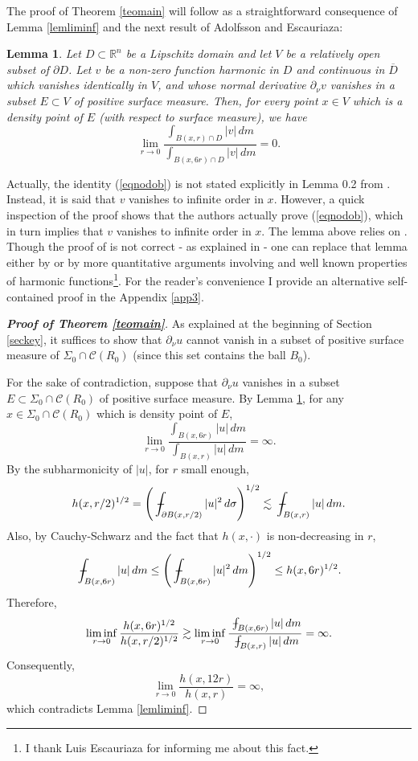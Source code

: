 \documentclass[11pt]{amsart}
\newcommand{\R}{{\mathbb R}}       %
\newcommand{\CC}{{\mathcal C}}
\newcommand{\rf}[1]{{(\ref{#1})}}
\newcommand{\vv}{{\vspace{2mm}}}
\def\Xint#1{\mathchoice
{\XXint\displaystyle\textstyle{#1}}%
{\XXint\textstyle\scriptstyle{#1}}%
{\XXint\scriptstyle\scriptscriptstyle{#1}}%
{\XXint\scriptscriptstyle\scriptscriptstyle{#1}}%
\!\int}
\def\XXint#1#2#3{{\setbox0=\hbox{$#1{#2#3}{\int}$ }
\vcenter{\hbox{$#2#3$ }}\kern-.58\wd0}}
\def\avint{\;\Xint-}
\newtheorem{lemma}[theorem]{Lemma}
\theoremstyle{definition}
\theoremstyle{remark}
\numberwithin{equation}{section}
\begin{document}
The proof of Theorem \ref{teomain} will follow as a straightforward consequence of Lemma \ref{lemliminf}
and the next result of Adolfsson and Escauriaza:

\begin{lemma}\cite[Lemma 0.2]{AE} \label{lemAE}
Let $D\subset\R^n$ be a Lipschitz domain and let $V$ be a relatively open subset of $\partial D$.
Let $v$ be a non-zero function harmonic in $D$ and continuous in $\overline D$ which vanishes identically
in $V$, and whose normal derivative $\partial_\nu v$ vanishes in a subset $E\subset V$ of positive
surface measure. Then, for every point $x\in V$ which is a density point of $E$ (with respect to surface measure),
we have
\begin{equation}\label{eqnodob}
\lim_{r\to 0} \frac{\int_{B(x,r)\cap D} |v|\,dm}{\int_{B(x,6r)\cap D} |v|\,dm} = 0.
\end{equation}
\end{lemma}

Actually, the identity \rf{eqnodob} is not stated explicitly in
Lemma 0.2 from \cite{AE}. Instead, it is said that $v$ vanishes to infinite order in $x$. However, a quick 
inspection of the proof shows that the authors actually prove \rf{eqnodob}, which in turn implies that
$v$ vanishes to infinite order in $x$. 
The lemma above relies on \cite[Lemma 1 and Theorem 1]{AEK}. Though the proof of \cite[Lemma 1]{AEK} is not correct - as explained in \cite[paragraph before Lemma 5]{AEWZ} -  one can replace that lemma either
by \cite[Lemma 2.2]{AE} or by more quantitative arguments involving \cite[Lemma 4]{AEWZ} and well known properties of harmonic functions\footnote{I thank Luis Escauriaza for informing me about this fact.}.  For the reader's convenience I provide an alternative self-contained proof in the Appendix \ref{app3}.


\vv

\begin{proof}[\bf Proof of Theorem \ref{teomain}]
As explained at the beginning of Section \ref{seckey}, it suffices to show that $\partial_\nu u$ cannot vanish
in a subset of positive surface measure of $\Sigma_0 \cap \CC(R_0)$ (since this set contains the ball $B_0$). 

For the sake of contradiction, suppose that $\partial_\nu u$ vanishes in a subset $E\subset
\Sigma_0 \cap \CC(R_0)$ of positive surface measure. By Lemma \ref{lemAE}, for any $x\in \Sigma_0 \cap \CC(R_0)$
which is density point of $E$, 
$$\lim_{r\to 0} \frac{\int_{B(x,6r)} |u|\,dm}{\int_{B(x,r)} |u|\,dm} = \infty.$$
By the subharmonicity of $|u|$, for $r$ small enough,
$$h(x,r/2)^{1/2} = \left(\avint_{\partial B(x,r/2)}|u|^2\,d\sigma\right)^{1/2}\lesssim \avint_{B(x,r)}|u|\,dm.$$
Also, by Cauchy-Schwarz and the fact that $h(x,\cdot)$ is non-decreasing in $r$,
$$\avint_{B(x,6r)} |u|\,dm \leq \left(\avint_{B(x,6r)} |u|^2\,dm\right)^{1/2}\leq
h(x,6r)^{1/2}.$$
Therefore,
$$\liminf_{r\to0} \frac{h(x,6r)^{1/2}}{h(x,r/2)^{1/2}} \gtrsim \liminf_{r\to0}  \frac{\avint_{B(x,6r)} |u|\,dm}{\avint_{B(x,r)} |u|\,dm} = \infty.$$
Consequently,
$$\lim_{r\to0} \frac{h(x,12r)}{h(x,r)}=\infty,$$
which contradicts Lemma \ref{lemliminf}.
\end{proof}
\vv
\end{document}
